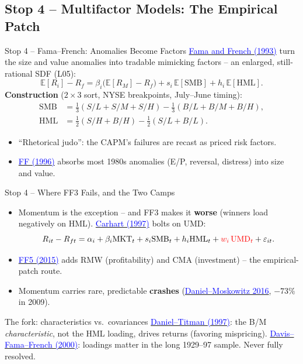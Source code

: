\documentclass{beamer}
\newcommand{\E}{\mathbb{E}}
\begin{document}
\subsection{Stop 4 -- Multifactor Models: The Empirical Patch}

\begin{frame}{Stop 4 -- Fama--French: Anomalies Become Factors}
\href{https://doi.org/10.1016/0304-405X(93)90023-5}{\textcolor{blue}{Fama and French (1993)}} turn the size and value anomalies into \alert{tradable mimicking factors} -- an enlarged, still-rational SDF (L05):
\[
\E[R_i]-R_f=\beta_i\big(\E[R_M]-R_f\big)+s_i\,\E[\mathrm{SMB}]+h_i\,\E[\mathrm{HML}].
\]
\textbf{Construction} ($2\times3$ sort, NYSE breakpoints, July--June timing):
\begin{align*}
\mathrm{SMB}&=\tfrac{1}{3}(S/L+S/M+S/H)-\tfrac{1}{3}(B/L+B/M+B/H),\\
\mathrm{HML}&=\tfrac{1}{2}(S/H+B/H)-\tfrac{1}{2}(S/L+B/L).
\end{align*}
\begin{itemize}
  \item ``Rhetorical judo'': the CAPM's failures are recast as priced risk factors.
  \item \href{https://doi.org/10.1111/j.1540-6261.1996.tb05202.x}{\textcolor{blue}{FF (1996)}} absorbs most 1980s anomalies (E/P, reversal, distress) into size and value.
\end{itemize}
\end{frame}

\begin{frame}{Stop 4 -- Where FF3 Fails, and the Two Camps}
\begin{itemize}
  \item \alert{Momentum is the exception} -- and FF3 makes it \textbf{worse} (winners load negatively on HML). \href{https://doi.org/10.1111/j.1540-6261.1997.tb03808.x}{\textcolor{blue}{Carhart (1997)}} bolts on UMD:
  \[
  R_{it}-R_{ft}=\alpha_i+\beta_i\mathrm{MKT}_t+s_i\mathrm{SMB}_t+h_i\mathrm{HML}_t+\textcolor{red}{w_i\,\mathrm{UMD}_t}+\varepsilon_{it}.
  \]
  \item \href{https://doi.org/10.1016/j.jfineco.2014.10.010}{\textcolor{blue}{FF5 (2015)}} adds RMW (profitability) and CMA (investment) -- the \alert{empirical-patch} route.
  \item Momentum carries rare, predictable \textbf{crashes} (\href{https://doi.org/10.1016/j.jfineco.2015.12.002}{\textcolor{blue}{Daniel--Moskowitz 2016}}, $-73\%$ in 2009).
\end{itemize}
\begin{block}{The fork: characteristics vs.\ covariances}
\href{https://doi.org/10.1111/j.1540-6261.1997.tb02724.x}{\textcolor{blue}{Daniel--Titman (1997)}}: the B/M \emph{characteristic}, not the HML loading, drives returns (favoring mispricing). \href{https://doi.org/10.1111/0022-1082.00209}{\textcolor{blue}{Davis--Fama--French (2000)}}: loadings matter in the long 1929--97 sample. \alert{Never fully resolved.}
\end{block}
\end{frame}
\end{document}
